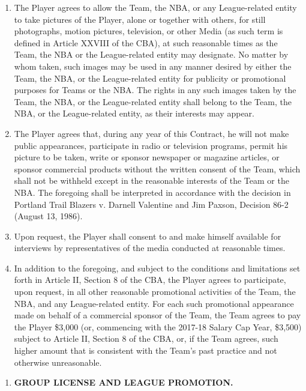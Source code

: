 \documentclass[
]{book}
\providecommand{\tightlist}{%
  \setlength{\itemsep}{0pt}\setlength{\parskip}{0pt}}
\begin{document}
\begin{enumerate}
\def\labelenumi{(\alph{enumi})}
\tightlist
\item
  The Player agrees to allow the Team, the NBA, or any League-related entity to take pictures of the Player, alone or together with others, for still photographs, motion pictures, television, or other Media (as such term is defined in Article XXVIII of the CBA), at such reasonable times as the Team, the NBA or the League-related entity may designate. No matter by whom taken, such images may be used in any manner desired by either the Team, the NBA, or the League-related entity for publicity or promotional purposes for Teams or the NBA. The rights in any such images taken by the Team, the NBA, or the League-related entity shall belong to the Team, the NBA, or the League-related entity, as their interests may appear.
\item
  The Player agrees that, during any year of this Contract, he will not make public appearances, participate in radio or television programs, permit his picture to be taken, write or sponsor newspaper or magazine articles, or sponsor commercial products without the written consent of the Team, which shall not be withheld except in the reasonable interests of the Team or the NBA. The foregoing shall be interpreted in accordance with the decision in Portland Trail Blazers v. Darnell Valentine and Jim Paxson, Decision 86-2 (August 13, 1986).
\item
  Upon request, the Player shall consent to and make himself available for interviews by representatives of the media conducted at reasonable times.
\item
  In addition to the foregoing, and subject to the conditions and limitations set forth in Article II, Section 8 of the CBA, the Player agrees to participate, upon request, in all other reasonable promotional activities of the Team, the NBA, and any League-related entity. For each such promotional appearance made on behalf of a commercial sponsor of the Team, the Team agrees to pay the Player \$3,000 (or, commencing with the 2017-18 Salary Cap Year, \$3,500) subject to Article II, Section 8 of the CBA, or, if the Team agrees, such higher amount that is consistent with the Team's past practice and not otherwise unreasonable.
\end{enumerate}

\begin{enumerate}
\def\labelenumi{\arabic{enumi}.}
\setcounter{enumi}{13}
\tightlist
\item
  \textbf{GROUP LICENSE AND LEAGUE PROMOTION.}
\end{enumerate}
\end{document}
